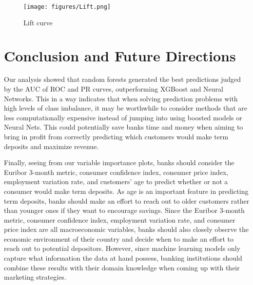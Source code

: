 \documentclass[12pt]{article}
\begin{document}
\begin{figure}[ht!]
    \centering
    \texttt{[image: figures/Lift.png]}
    \caption{Lift curve}
    \label{lift_curve}
\end{figure}

\section*{Conclusion and Future Directions}
Our analysis showed that random forests generated the best predictions judged by the AUC of ROC and PR curves, outperforming XGBoost and Neural Networks. This in a way indicates that when solving prediction problems with high levels of class imbalance, it may be worthwhile to consider methods that are less computationally expensive instead of jumping into using boosted models or Neural Nets. This could potentially save banks time and money when aiming to bring in profit from correctly predicting which customers would make term deposits and maximize revenue.

Finally, seeing from our variable importance plots, banks should consider the Euribor 3-month metric, consumer confidence index, consumer price index, employment variation rate, and customers' age to predict whether or not a consumer would make term deposits. As age is an important feature in predicting term deposits, banks should make an effort to reach out to older customers rather than younger ones if they want to encourage savings. Since the Euribor 3-month metric, consumer confidence index, employment variation rate, and consumer price index are all macroeconomic variables, banks should also closely observe the economic environment of their country and decide when to make an effort to reach out to potential depositors. However, since machine learning models only capture what information the data at hand possess, banking institutions should combine these results with their domain knowledge when coming up with their marketing strategies. 

\clearpage \newpage
\nocite{James2013}



\clearpage \newpage
\end{document}
